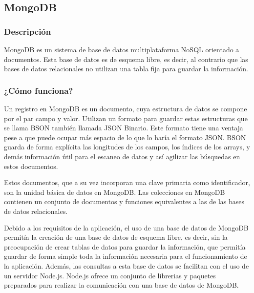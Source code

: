 \subsection{MongoDB}

\subsubsection{ Descripción }

MongoDB  \cite{URL::MongoDB} es un sistema de base de datos multiplataforma NoSQL   \cite{URL::NoSQL} orientado a documentos. Esta base de datos es de esquema libre, es decir, al contrario que las bases de datos relacionales no utilizan una tabla fija para guardar la información.
\subsubsection{ ¿Cómo funciona? }

Un registro en MongoDB es un documento, cuya estructura de datos se compone por el par campo y valor. Utilizan un formato para guardar estas estructuras que se llama BSON  \cite{URL::BSON} también llamada JSON \cite{URL::json} Binario. Este formato tiene una ventaja pese a que puede ocupar más espacio de lo que lo haría el formato JSON. BSON guarda de forma explícita las longitudes de los campos, los índices de los arrays, y demás información útil para el escaneo de datos y así agilizar las búsquedas en estos documentos.

Estos documentos, que a su vez incorporan una clave primaria como identificador, son la unidad básica de datos en MongoDB. Las colecciones en MongoDB contienen un conjunto de documentos y funciones equivalentes a las de las bases de datos relacionales.

Debido a los requisitos de la aplicación, el uso de una base de datos de MongoDB
permitía la creación de una base de datos de esquema libre, es decir, sin la preocupación de crear tablas de datos para guardar la información, que permitía guardar de forma simple toda la información necesaria para el funcionamiento de la aplicación. Además, las consultas a esta base de datos se facilitan con el uso de un servidor Node.js. Node.js ofrece un conjunto de librerias y paquetes preparados para realizar la comunicación con una base de datos de MongoDB.


